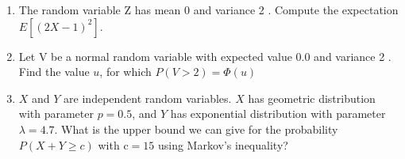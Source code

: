 \documentclass[10pt]{article}
\begin{document}
\begin{enumerate}
\newpage
  \item The random variable $\mathrm{Z}$ has mean 0 and variance 2 . Compute the expectation $E\left[(2 X-1)^2\right]$.

\newpage
  \item Let $\mathrm{V}$ be a normal random variable with expected value 0.0 and variance 2 . Find the value $u$, for which $P(V>2)=\Phi(u)$

\newpage
  \item $X$ and $Y$ are independent random variables. $X$ has geometric distribution with parameter $p=0.5$, and $Y$ has exponential distribution with parameter $\lambda=4.7$. What is the upper bound we can give for the probability $P(X+Y \geq c)$ with $\mathrm{c}=15$ using Markov's inequality?
\end{enumerate}
\end{document}
